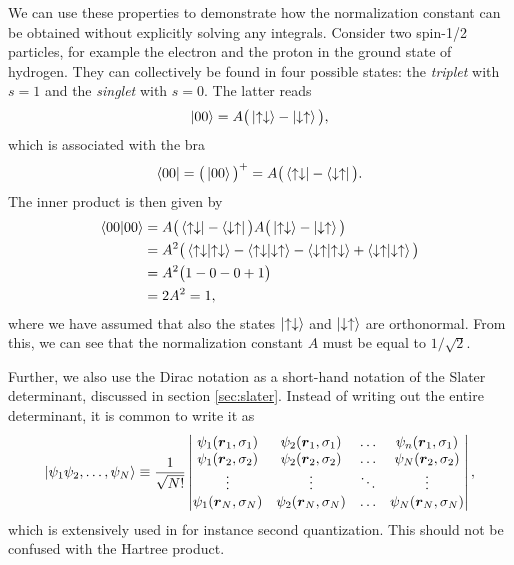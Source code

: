 We can use these properties to demonstrate how the normalization constant can be obtained without explicitly solving any integrals. Consider two spin-1/2 particles, for example the electron and the proton in the ground state of hydrogen. They can collectively be found in four possible states: the \textit{triplet} with $s=1$ and the \textit{singlet} with $s=0$. The latter reads \cite{griffiths_introduction_2005}
\begin{equation}
\ket{00}=A\big(\ket{\uparrow\downarrow}-\ket{\downarrow\uparrow}\big),
\end{equation}
which is associated with the bra
\begin{equation}
\bra{00}=\big(\ket{00}\big)^+=A\big(\bra{\uparrow\downarrow}-\bra{\downarrow\uparrow}\big).
\end{equation}
The inner product is then given by
\begin{equation}
\begin{aligned}
\braket{00}{00}&=A\big(\bra{\uparrow\downarrow}-\bra{\downarrow\uparrow}\big)A\big(\ket{\uparrow\downarrow}-\ket{\downarrow\uparrow}\big)\\
&=A^2\big(\braket{\uparrow\downarrow}{\uparrow\downarrow}-\braket{\uparrow\downarrow}{\downarrow\uparrow}-\braket{\downarrow\uparrow}{\uparrow\downarrow}+\braket{\downarrow\uparrow}{\downarrow\uparrow}\big)\\
&=A^2\big(1-0-0+1\big)\\
&=2A^2=1,
\end{aligned}
\end{equation}
where we have assumed that also the states $\ket{\uparrow\downarrow}$ and $\ket{\downarrow\uparrow}$ are orthonormal. From this, we can see that the normalization constant $A$ must be equal to $1/\sqrt{2}$.

Further, we also use the Dirac notation as a short-hand notation of the Slater determinant, discussed in section \ref{sec:slater}. Instead of writing out the entire determinant, it is common to write it as
\begin{equation}
\ket{\psi_1\psi_2,\hdots,\psi_N}\equiv\frac{1}{\sqrt{N!}}
\begin{vmatrix}
\psi_1(\boldsymbol{r}_1,\sigma_1) & \psi_2(\boldsymbol{r}_1,\sigma_1) & \hdots & \psi_n(\boldsymbol{r}_1,\sigma_1)\\
\psi_1(\boldsymbol{r}_2,\sigma_2) & \psi_2(\boldsymbol{r}_2,\sigma_2) & \hdots & \psi_N(\boldsymbol{r}_2,\sigma_2)\\
\vdots & \vdots & \ddots & \vdots \\
\psi_1(\boldsymbol{r}_N,\sigma_N) & \psi_2(\boldsymbol{r}_N,\sigma_N) & \hdots & \psi_N(\boldsymbol{r}_N,\sigma_N)
\end{vmatrix},
\end{equation}
which is extensively used in for instance second quantization. This should not be confused with the Hartree product. 